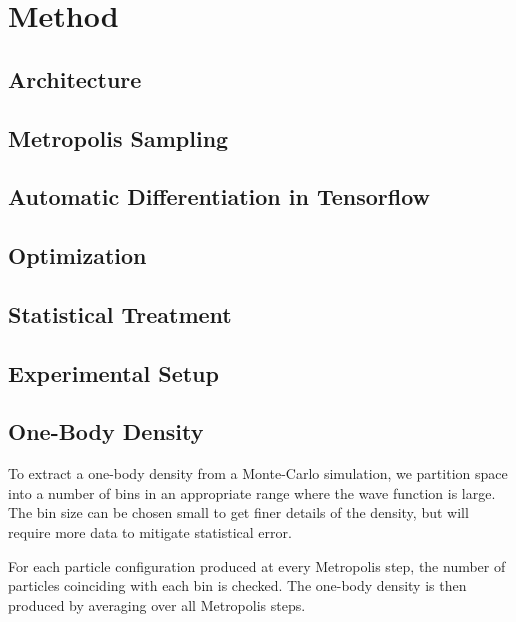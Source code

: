 \section{Method}\label{sec:Method}
\subsection{Architecture}


\subsection{Metropolis Sampling}


\subsection{Automatic Differentiation in Tensorflow}


\subsection{Optimization}


\subsection{Statistical Treatment}


\subsection{Experimental Setup}


\subsection{One-Body Density}
To extract a one-body density from a Monte-Carlo simulation, we partition space into a number of bins in an appropriate range where the wave function is large. The bin size can be chosen small to get finer details of the density, but will require more data to mitigate statistical error.

For each particle configuration produced at every Metropolis step, the number of particles coinciding with each bin is checked. The one-body density is then produced by averaging over all Metropolis steps.


